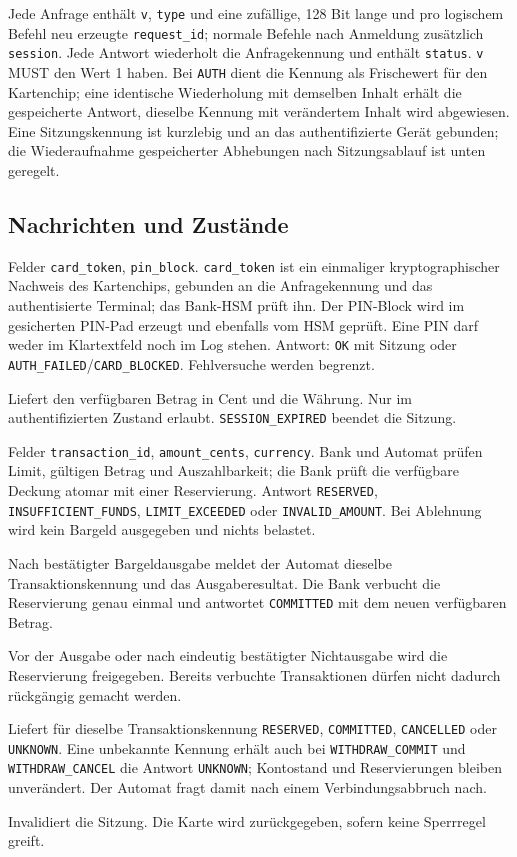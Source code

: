 \documentclass[a4paper,11pt]{article}
\begin{document}
Jede Anfrage enthält \texttt{v}, \texttt{type} und eine zufällige, 128 Bit lange und pro logischem Befehl neu erzeugte \texttt{request\_id}; normale Befehle nach Anmeldung zusätzlich \texttt{session}. Jede Antwort wiederholt die Anfragekennung und enthält \texttt{status}. \texttt{v} MUST den Wert 1 haben. Bei \texttt{AUTH} dient die Kennung als Frischewert für den Kartenchip; eine identische Wiederholung mit demselben Inhalt erhält die gespeicherte Antwort, dieselbe Kennung mit verändertem Inhalt wird abgewiesen. Eine Sitzungskennung ist kurzlebig und an das authentifizierte Gerät gebunden; die Wiederaufnahme gespeicherter Abhebungen nach Sitzungsablauf ist unten geregelt.
\subsection*{Nachrichten und Zustände}
\begin{description}[style=nextline]
\item[AUTH:] Felder \texttt{card\_token}, \texttt{pin\_block}. \texttt{card\_token} ist ein einmaliger kryptographischer Nachweis des Kartenchips, gebunden an die Anfragekennung und das authentisierte Terminal; das Bank-HSM prüft ihn. Der PIN-Block wird im gesicherten PIN-Pad erzeugt und ebenfalls vom HSM geprüft. Eine PIN darf weder im Klartextfeld noch im Log stehen. Antwort: \texttt{OK} mit Sitzung oder \texttt{AUTH\_FAILED}/\texttt{CARD\_BLOCKED}. Fehlversuche werden begrenzt.
\item[BALANCE:] Liefert den verfügbaren Betrag in Cent und die Währung. Nur im authentifizierten Zustand erlaubt. \texttt{SESSION\_EXPIRED} beendet die Sitzung.
\item[WITHDRAW\_PREPARE:] Felder \texttt{transaction\_id}, \texttt{amount\_cents}, \texttt{currency}. Bank und Automat prüfen Limit, gültigen Betrag und Auszahlbarkeit; die Bank prüft die verfügbare Deckung atomar mit einer Reservierung. Antwort \texttt{RESERVED}, \texttt{INSUFFICIENT\_FUNDS}, \texttt{LIMIT\_EXCEEDED} oder \texttt{INVALID\_AMOUNT}. Bei Ablehnung wird kein Bargeld ausgegeben und nichts belastet.
\item[WITHDRAW\_COMMIT:] Nach bestätigter Bargeldausgabe meldet der Automat dieselbe Transaktionskennung und das Ausgaberesultat. Die Bank verbucht die Reservierung genau einmal und antwortet \texttt{COMMITTED} mit dem neuen verfügbaren Betrag.
\item[WITHDRAW\_CANCEL:] Vor der Ausgabe oder nach eindeutig bestätigter Nichtausgabe wird die Reservierung freigegeben. Bereits verbuchte Transaktionen dürfen nicht dadurch rückgängig gemacht werden.
\item[STATUS:] Liefert für dieselbe Transaktionskennung \texttt{RESERVED}, \texttt{COMMITTED}, \texttt{CANCELLED} oder \texttt{UNKNOWN}. Eine unbekannte Kennung erhält auch bei \texttt{WITHDRAW\_COMMIT} und \texttt{WITHDRAW\_CANCEL} die Antwort \texttt{UNKNOWN}; Kontostand und Reservierungen bleiben unverändert. Der Automat fragt damit nach einem Verbindungsabbruch nach.
\item[LOGOUT:] Invalidiert die Sitzung. Die Karte wird zurückgegeben, sofern keine Sperrregel greift.
\end{description}
\end{document}
